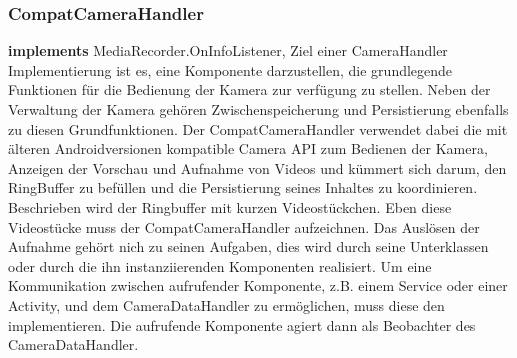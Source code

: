 \subsubsection{CompatCameraHandler} \label{app:klasse:CompatCameraHandler}
\textbf{implements} MediaRecorder.OnInfoListener,  \newline
Ziel einer CameraHandler Implementierung ist es, eine Komponente darzustellen, die grundlegende Funktionen für die Bedienung der Kamera zur verfügung zu stellen. Neben der Verwaltung der Kamera gehören Zwischenspeicherung und Persistierung ebenfalls zu diesen Grundfunktionen. Der CompatCameraHandler verwendet dabei die mit älteren Androidversionen kompatible Camera API zum Bedienen der Kamera, Anzeigen der Vorschau und Aufnahme von Videos und kümmert sich darum, den RingBuffer zu befüllen und die Persistierung seines Inhaltes zu koordinieren. Beschrieben wird der Ringbuffer mit kurzen Videostückchen. Eben diese Videostücke muss der CompatCameraHandler aufzeichnen.
Das Auslösen der Aufnahme gehört nich zu seinen Aufgaben, dies wird durch seine Unterklassen oder durch die ihn instanziierenden Komponenten realisiert. Um eine Kommunikation zwischen aufrufender Komponente, z.B. einem Service oder einer Activity, und dem CameraDataHandler zu ermöglichen, muss diese den  implementieren. Die aufrufende Komponente agiert dann als Beobachter des CameraDataHandler.
\newline

